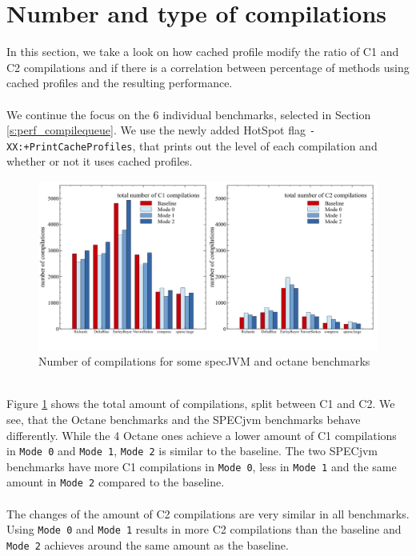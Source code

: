 \section{Number and type of compilations}
\label{s:perf_compilenumber}
In this section, we take a look on how cached profile modify the ratio of C1 and C2 compilations and if there is a correlation between percentage of methods using cached profiles and the resulting performance.
\\\\
We continue the focus on the 6 individual benchmarks, selected in Section \ref{s:perf_compilequeue}.
We use the newly added HotSpot flag \texttt{-XX:+PrintCacheProfiles}, that prints out the level of each compilation and whether or not it uses cached profiles.
\begin{figure}[ht!]
  \begin{center}
    \centering
    \includegraphics[width=1.0\textwidth]{figures/queue_total.png}
    \caption{Number of compilations for some specJVM and octane benchmarks}
    \label{f:queue_total}
  \end{center}
\end{figure}
\\
Figure \ref{f:queue_total} shows the total amount of compilations, split between C1 and C2.
We see, that the Octane benchmarks and the SPECjvm benchmarks behave differently. While the 4 Octane ones achieve a lower amount of C1 compilations in \texttt{Mode 0} and \texttt{Mode 1}, \texttt{Mode 2} is similar to the baseline. The two SPECjvm benchmarks have more C1 compilations in \texttt{Mode 0}, less in \texttt{Mode 1} and the same amount in \texttt{Mode 2} compared to the baseline.
\\\\
The changes of the amount of C2 compilations are very similar in all benchmarks. Using \texttt{Mode 0} and \texttt{Mode 1} results in more C2 compilations than the baseline and \texttt{Mode 2} achieves around the same amount as the baseline.

